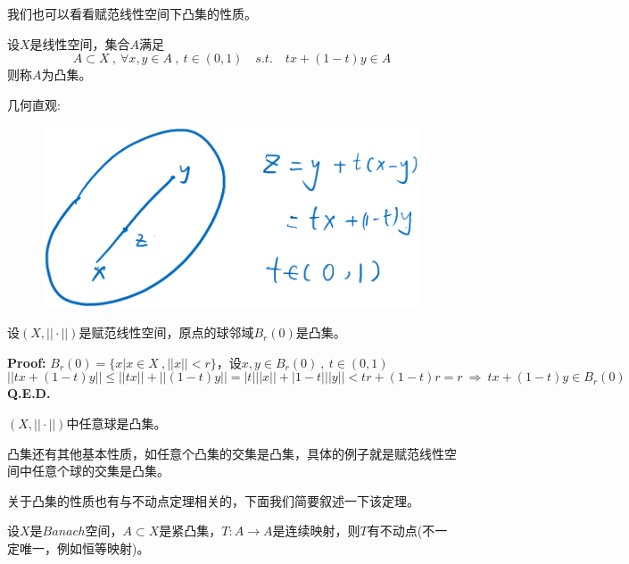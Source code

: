 我们也可以看看赋范线性空间下凸集的性质。
\begin{definition}[凸集]
    设$X$是线性空间，集合$A$满足
    \[A \subset X \ , \ \forall x,y \in A \ , \ t \in (0,1) \quad s.t. \quad tx+(1-t)y \in A\]
    则称$A$为凸集。
\end{definition}
几何直观:
\begin{figure}[htbp]
    \center
    \includegraphics[scale=0.22]{./fig/3.1.2.png}
\end{figure}
\begin{theorem}
    设$(X,||\cdot||)$是赋范线性空间，原点的球邻域$B_r(0)$是凸集。
\end{theorem}
\textbf{Proof:} $B_r(0)=\{x|x \in X \ ,||x||<r\}$，设$x,y \in B_r(0) \ , \ t \in (0,1)$
\[||tx+(1-t)y|| \leq ||tx||+||(1-t)y||=|t|||x||+|1-t|||y||<tr+(1-t)r=r \ \Rightarrow \ tx+(1-t)y \in B_r(0)\]
\textbf{Q.E.D.}
\begin{proposition}
    $(X,||\cdot||)$中任意球是凸集。
\end{proposition}
凸集还有其他基本性质，如任意个凸集的交集是凸集，具体的例子就是赋范线性空间中任意个球的交集是凸集。

关于凸集的性质也有与不动点定理相关的，下面我们简要叙述一下该定理。
\begin{theorem}
    设$X$是$Banach$空间，$A \subset X$是紧凸集，$T:A \to A$是连续映射，则$T$有不动点(不一定唯一，例如恒等映射)。
\end{theorem}
